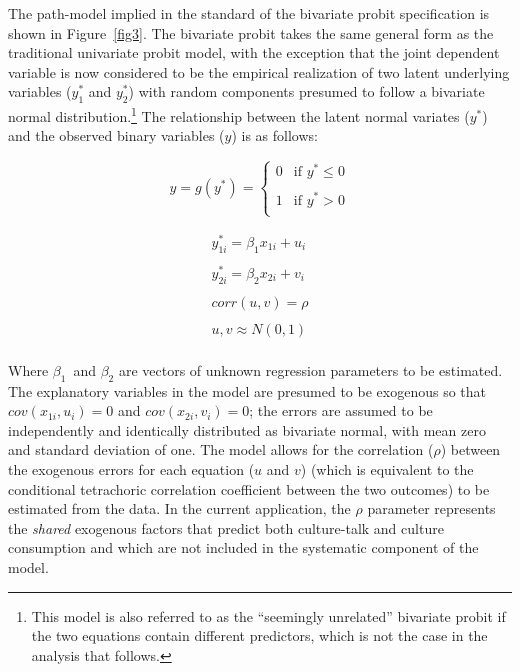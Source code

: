 \documentclass[11pt]{article}
\begin{document}
The path-model implied in the standard of the bivariate probit specification is shown in Figure~\ref{fig3}. The bivariate probit takes the same general form as the traditional univariate probit model, with the exception that the joint dependent variable is now considered to be the empirical realization of two latent underlying variables ($y^{*}_{1}$ and $y^{*}_{2}$) with random components presumed to follow a bivariate normal distribution.\footnote{This model is also referred to as the ``seemingly unrelated'' bivariate probit if the two equations contain different predictors, which is not the case in the analysis that follows.} The relationship between the latent normal variates ($y^{*}$) and the observed binary variables ($y$) is as follows:

\begin{equation}
y=g(y^{*})=\left\{
        \begin{array}{rl}
                0 &\mbox{if $y^{*} \leq 0$} \\ \\
                1 &\mbox{if $y^{*} > 0$}  \\
        \end{array} \right.
        \label{eq1}
\end{equation}

\begin{equation}
        \begin{array}{rl}
                y^{*}_{1i}=\beta_{1} x_{1i}+u_{i} \\  \\
                y^{*}_{2i}=\beta_{2} x_{2i}+v_{i} \\ \\
                corr(u,v)=\rho \\ \\
                u,v \approx N(0,1)  \\
        \end{array}
        \label{eq2}
\end{equation}

Where $\beta_{1}$\ and $\beta_{2}$ are vectors of unknown regression parameters to be estimated.  The explanatory variables in the model are presumed to be exogenous so that $cov(x_{1i},u_{i})=0$ and $cov(x_{2i},v_{i})=0$;  the errors are assumed to be independently and identically distributed as bivariate normal, with mean zero and standard deviation of one. The model allows for the correlation ($\rho$) between the exogenous errors for each equation ($u$ and $v$) (which is equivalent to the conditional tetrachoric correlation coefficient between the two outcomes) to be estimated from the data. In the current application, the $\rho$ parameter represents the \emph{shared} exogenous factors that predict both culture-talk and culture consumption and which are not included in the systematic component of the model. 
\end{document}

